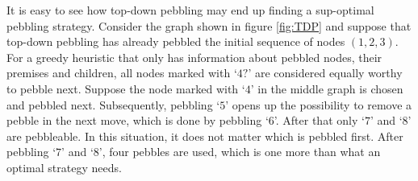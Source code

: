 \documentclass{llncs}
\begin{document}
\begin{example}
It is easy to see how top-down pebbling may end up finding a sup-optimal pebbling strategy. Consider the graph shown in figure \ref{fig:TDP} and suppose that top-down pebbling has already pebbled the initial sequence of nodes $(1,2,3)$. 
For a greedy heuristic that only has information about pebbled nodes, their premises and children, all nodes marked with `$4?$' are considered equally worthy to pebble next.
Suppose the node marked with `$4$' in the middle graph is chosen and pebbled next.
Subsequently, pebbling `$5$' opens up the possibility to remove a pebble in the next move, which is done by pebbling `$6$'.
After that only `$7$' and `$8$' are pebbleable. In this situation, it does not matter which is pebbled first.
After pebbling `$7$' and `$8$', four pebbles are used, which is one more than what an optimal strategy needs.



\end{example}
\end{document}
